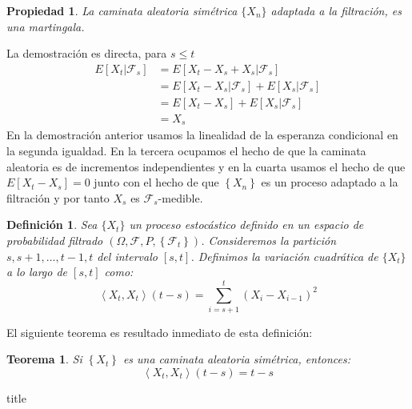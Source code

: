 \documentclass{extreport}
\makeatletter
\theoremstyle{definicion}
\newtheorem{definition}{Definición}[chapter]
\theoremstyle{propiedad}
\newtheorem{propiedad}{Propiedad}[chapter]
\theoremstyle{teorema}
\newtheorem{teorema}{Teorema}[chapter]
\renewenvironment{proof}[1][\proofname]{\par
    \pushQED{\qed}%
    \normalfont \topsep6\p@\@plus6\p@\relax
    \trivlist
    \item\relax
            {\itshape
        #1\@addpunct{.}}\hspace\labelsep\ignorespaces
}{%
    \popQED\endtrivlist\@endpefalse
}
\makeatother
\begin{document}
\begin{propiedad}
    La caminata aleatoria simétrica $\{X_n\}$ adaptada a la filtración, es una martingala.
\end{propiedad}
\begin{proof}
    La demostración es directa, para $s\leq t$
    \begin{equation*}
        \begin{split}
            E\left[X_t\vert \mathcal{F}_s\right] & = E\left[X_t-X_s + X_s\vert\mathcal{F}_s\right]\\
                                                 & = E\left[X_t-X_s\vert\mathcal{F}_s\right] + E\left[X_s\vert\mathcal{F}_s\right]\\
                                                 & = E\left[X_t-X_s\right] + E\left[X_s\vert\mathcal{F}_s\right]\\
                                                 & = X_s
        \end{split}
    \end{equation*}
\end{proof}
En la demostración anterior usamos la linealidad de la esperanza condicional en la segunda igualdad. En la tercera ocupamos el hecho de que la caminata aleatoria es de incrementos independientes y en la cuarta usamos el hecho de que $E[X_t-X_s] = 0$ junto con el hecho de que $\left\{X_n\right\}$ es un proceso adaptado a la filtración y por tanto $X_s$ es $\mathcal{F}_s$-medible.
\begin{definition}
    Sea $\{X_t\}$ un proceso estocástico definido en un espacio de probabilidad filtrado $(\Omega, \mathcal{F}, P, \left\{\mathcal{F}_t\right\})$. Consideremos la partición $s,s+1, \ldots, t-1, t $  del intervalo $[s, t]$. Definimos la \emph{variación cuadrática} de $\{X_t\}$ a lo largo de $[s,t]$ como:
    \begin{equation}
        \left\langle X_t, X_t\right\rangle(t-s) = \sum_{i=s+1}^t \left(X_{i} - X_{i-1}\right)^2
        \label{varquad:1}
    \end{equation}
\end{definition}
El siguiente teorema es resultado inmediato de esta definición:
\begin{teorema}
    Si $\left\{X_t\right\}$ es una caminata aleatoria simétrica, entonces:
        \begin{equation}
        \left\langle X_t, X_t\right\rangle(t-s) = t-s
        \label{varquad:rw}
    \end{equation}
\end{teorema}title
\end{document}
